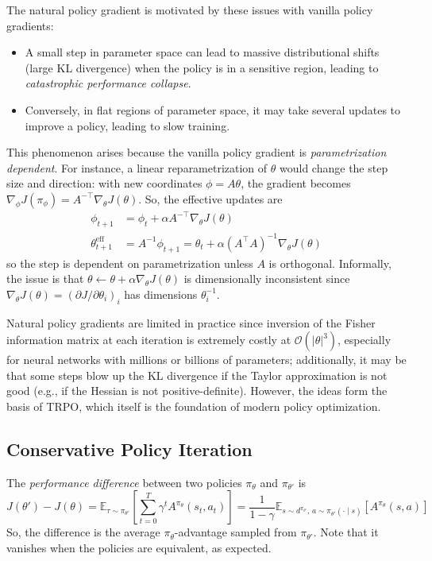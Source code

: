 \documentclass[11pt, letterpaper]{article}
\begin{document}
\begin{remark}
    The natural policy gradient is motivated by these issues with vanilla policy gradients: 
    \begin{itemize}
        \item A small step in parameter space can lead to massive distributional shifts (large KL divergence) when the policy is in a sensitive region, leading to \textit{catastrophic performance collapse}. 
        \item Conversely, in flat regions of parameter space, it may take several updates to improve a policy, leading to slow training. 
    \end{itemize}
    This phenomenon arises because the vanilla policy gradient is \textit{parametrization dependent}. For instance, a linear reparametrization of \(\theta\) would change the step size and direction: with new coordinates \(\phi = A\theta\), the gradient becomes \(\nabla_\phi J(\pi_\phi) = A^{-\top} \nabla_\theta J(\theta)\). So, the effective updates are
    \begin{align*}
        \phi_{t+1} &= \phi_t + \alpha A^{-\top} \nabla_\theta J(\theta) \\
        \theta_{t+1}^{\text{eff}} &= A^{-1} \phi_{t+1} = \theta_t + \alpha (A^\top A)^{-1} \nabla_\theta J(\theta)
    \end{align*}
    so the step is dependent on parametrization unless \(A\) is orthogonal. Informally, the issue is that \(\theta \leftarrow \theta + \alpha \nabla_\theta J(\theta)\) is dimensionally inconsistent since \(\nabla_\theta J(\theta) = (\partial J / \partial \theta_i)_i\) has dimensions \(\theta_i^{-1}\). 

    Natural policy gradients are limited in practice since inversion of the Fisher information matrix at each iteration is extremely costly at \(\mathcal{O}(|\theta|^3)\), especially for neural networks with millions or billions of parameters; additionally, it may be that some steps blow up the KL divergence if the Taylor approximation is not good (e.g., if the Hessian is not positive-definite). However, the ideas form the basis of TRPO, which itself is the foundation of modern policy optimization. 
\end{remark}

\subsection{Conservative Policy Iteration}

\begin{concept}
    The \textit{performance difference} between two policies \(\pi_\theta\) and \(\pi_{\theta'}\) is
    \[
        J(\theta') - J(\theta) 
        = \mathbb{E}_{\tau \sim \pi_{\theta'}}\left[ \sum_{t=0}^T \gamma^t A^{\pi_\theta}(s_t, a_t) \right]
        = \frac{1}{1 - \gamma} \mathbb{E}_{s \sim d^{\pi_{\theta'}},\, a \sim \pi_{\theta'}(\cdot \mid s)}[ A^{\pi_\theta}(s, a)]
    \]
    So, the difference is the average \(\pi_\theta\)-advantage sampled from \(\pi_{\theta'}\). Note that it vanishes when the policies are equivalent, as expected. 
\end{concept}
\end{document}
